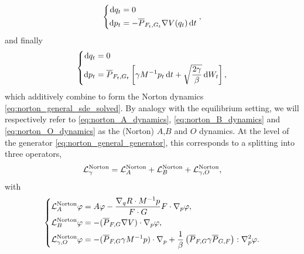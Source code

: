 \begin{definition}
    \begin{equation}
        \label{eq:norton_B_dynamics}
        \left\{
            \begin{aligned}
                \mathrm{d} q_t &= 0\\
                \mathrm{d} p_t &= -\overline{P}_{F_t,G_t}\nabla V(q_t)\,\mathrm{d} t
            \end{aligned}
        \right.,
    \end{equation}
    and finally
    \begin{equation}
        \label{eq:norton_O_dynamics}
        \left\{
            \begin{aligned}
                \mathrm{d} q_t &= 0\\
                \mathrm{d} p_t &= \overline{P}_{F_t,G_t}\left[\gamma M^{-1}p_t\,\mathrm{d} t +\sqrt{\frac{2\gamma}\beta}\,\mathrm{d} W_t\right],
            \end{aligned}
        \right.
    \end{equation}
    which additively combine to form the Norton dynamics \eqref{eq:norton_general_sde_solved}. By analogy with the equilibrium setting, we will respectively refer to \eqref{eq:norton_A_dynamics}, \eqref{eq:norton_B_dynamics} and \eqref{eq:norton_O_dynamics} as the (Norton) $A$,$B$ and $O$ dynamics.
    At the level of the generator \eqref{eq:norton_general_generator}, this corresponds to a splitting into three operators,
    \[\mathcal{L}_\gamma^{\mathrm{Norton}}=\mathcal{L}_{A}^{\mathrm{Norton}}+\mathcal{L}_{B}^{\mathrm{Norton}}+\mathcal{L}_{\gamma,O}^{\mathrm{Norton}},\]
    with
    \begin{equation}
        \label{eq:norton_generator_splitting}
        \left\{
            \begin{aligned}
                \mathcal{L}_{A}^{\mathrm{Norton}}\varphi &= A\varphi -\frac{\nabla_q R\cdot M^{-1}p}{F\cdot G}F\cdot \nabla_p \varphi,\\
                \mathcal{L}_{B}^{\mathrm{Norton}}\varphi &= -(\overline{P}_{F,G}\nabla V)\cdot \nabla_p \varphi,\\
                \mathcal{L}_{\gamma,O}^{\mathrm{Norton}}\varphi &= -(\overline{P}_{F,G}\gamma M^{-1}p)\cdot \nabla_p+\frac1\beta \left(\overline{P}_{F,G}\gamma\overline{P}_{G,F}\right):\nabla_p^2\varphi.
            \end{aligned}
        \right.
    \end{equation}
\end{definition}


